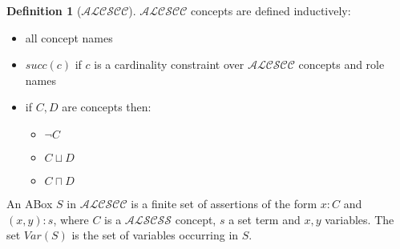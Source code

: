 \documentclass[a4paper,11pt]{scrartcl}
\theoremstyle{break}
\theoremstyle{definition}
\newtheorem{mydef}{Definition}
\begin{document}
\begin{mydef}[$\mathcal{ALCSCC}$]
$\mathcal{ALCSCC}$ concepts are defined inductively:
\begin{itemize}
\item all concept names
\item $succ(c)$ if $c$ is a cardinality constraint over $\mathcal{ALCSCC}$ concepts and role names
\item if $C,D$ are concepts then:
\begin{itemize}
\item $\neg C$
\item $C\sqcup D$
\item $C\sqcap D$
\end{itemize}
\end{itemize}
\end{mydef}
An ABox $S$ in $\mathcal{ALCSCC}$ is a finite set of assertions of the form $x:C$ and $(x,y):s$, where $C$ is a $\mathcal{ALSCSS}$ concept, $s$ a set term and $x,y$ variables. The set $Var(S)$ is the set of variables occurring in $S$. 
\end{document}
